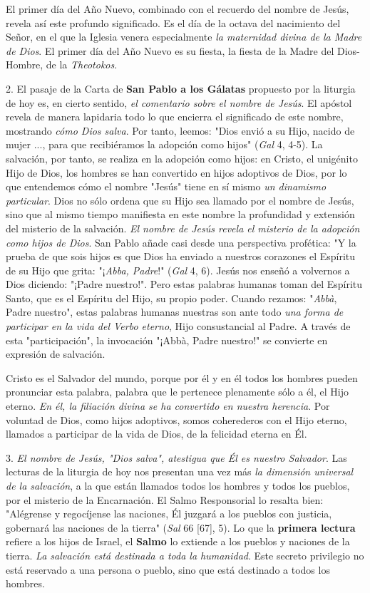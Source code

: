 El primer día del Año Nuevo, combinado con el recuerdo del nombre de
Jesús, revela así este profundo significado. Es el día de la octava del
nacimiento del Señor, en el que la Iglesia venera especialmente \emph{la
	maternidad divina de la Madre de Dios}. El primer día del Año Nuevo es
su fiesta, la fiesta de la Madre del Dios-Hombre, de la
\emph{Theotokos}.

2. El pasaje de la Carta de \textbf{San Pablo a los Gálatas} propuesto
por la liturgia de hoy es, en cierto sentido, \emph{el comentario sobre
	el nombre de Jesús}. El apóstol revela de manera lapidaria todo lo que
encierra el significado de este nombre, mostrando \emph{cómo Dios
	salva}. Por tanto, leemos: "Dios envió a su Hijo, nacido de mujer ...,
para que recibiéramos la adopción como hijos" (\emph{Gal} 4, 4-5). La
salvación, por tanto, se realiza en la adopción como hijos: en Cristo,
el unigénito Hijo de Dios, los hombres se han convertido en hijos
adoptivos de Dios, por lo que entendemos cómo el nombre "Jesús" tiene en
sí mismo \emph{un dinamismo particular}. Dios no sólo ordena que su Hijo
sea llamado por el nombre de Jesús, sino que al mismo tiempo manifiesta
en este nombre la profundidad y extensión del misterio de la salvación.
\emph{El nombre de Jesús revela el misterio de la adopción como hijos de
	Dios}. San Pablo añade casi desde una perspectiva profética: "Y la
prueba de que sois hijos es que Dios ha enviado a nuestros corazones el
Espíritu de su Hijo que grita: "¡\emph{Abba, Padre}!" (\emph{Gal} 4,
6). Jesús nos enseñó a volvernos a Dios diciendo: "¡Padre nuestro!".
Pero estas palabras humanas toman del Espíritu Santo, que es el Espíritu
del Hijo, su propio poder. Cuando rezamos: "\emph{Abbà}, Padre nuestro",
estas palabras humanas nuestras son ante todo \emph{una forma de
	participar en la vida del Verbo eterno}, Hijo consustancial al Padre. A
través de esta "participación", la invocación "¡Abbà, Padre nuestro!" se
convierte en expresión de salvación.

Cristo es el Salvador del mundo, porque por él y en él todos los hombres
pueden pronunciar esta palabra, palabra que le pertenece plenamente sólo
a él, el Hijo eterno. \emph{En él, la filiación divina se ha convertido
	en nuestra herencia}. Por voluntad de Dios, como hijos adoptivos, somos
coherederos con el Hijo eterno, llamados a participar de la vida de
Dios, de la felicidad eterna en Él.

3. \emph{El nombre de Jesús, "Dios salva", atestigua que Él es nuestro
	Salvador}. Las lecturas de la liturgia de hoy nos presentan una vez más
\emph{la dimensión universal de la salvación}, a la que están llamados
todos los hombres y todos los pueblos, por el misterio de la
Encarnación. El Salmo Responsorial lo resalta bien: "Alégrense y
regocíjense las naciones, Él juzgará a los pueblos con justicia,
gobernará las naciones de la tierra" (\emph{Sal} 66 {[}67{]}, 5). Lo que
la \textbf{primera lectura} refiere a los hijos de Israel, el
\textbf{Salmo} lo extiende a los pueblos y naciones de la tierra.
\emph{La salvación está destinada a toda la humanidad}. Este secreto
privilegio no está reservado a una persona o pueblo, sino que está
destinado a todos los hombres.

